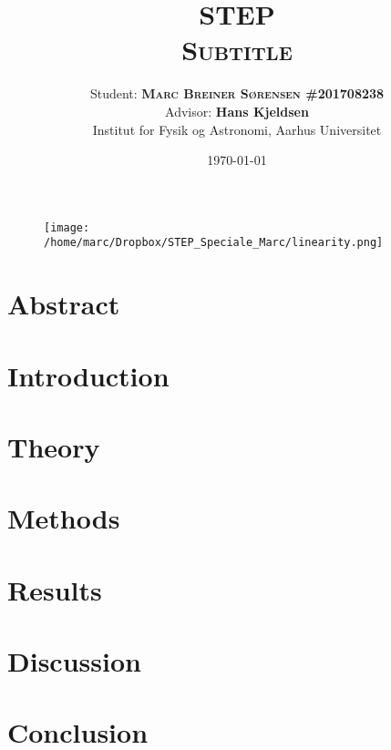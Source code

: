\documentclass[12pt, a4paper, twoside, article]{memoir}
\begin{document}
	
	\title{\textsc{\textbf{STEP} \\ \normalsize Subtitle}}
	\author{\normalsize Student: \textbf{\textsc{Marc Breiner Sørensen \#\small\textsf{201708238}}}\\
		\normalsize Advisor: \textbf{Hans Kjeldsen}\\
		\normalsize Institut for Fysik og Astronomi, Aarhus Universitet}
	\date{\textsc{\textsf{\today}}}
	\maketitle
	\begin{figure}[h!]
		\centering
		\texttt{[image: /home/marc/Dropbox/STEP\_Speciale\_Marc/linearity.png]}
	\end{figure}
	\thispagestyle{empty}
	
	
	\newpage
	\tableofcontents
	
	\newpage
	
	\chapter{Abstract}
	\newpage
	
	\chapter{Introduction}
	\newpage
	
	\chapter{Theory}
	\newpage
	
	\chapter{Methods}
	\newpage
	
	\chapter{Results}
	\newpage
	
	\chapter{Discussion}
	\newpage
	
	\chapter{Conclusion}
	
\end{document}
